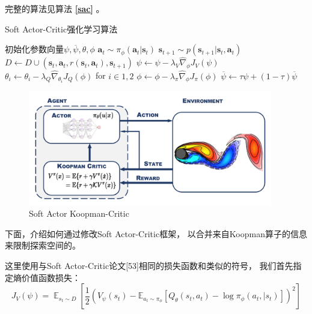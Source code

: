 \documentclass[AutoFakeBold]{LZUThesis}
\begin{document}
完整的算法见算法 \textbf{\ref{sac}} 。

\begin{algorithm}[H]
  \caption{Soft Actor-Critic强化学习算法}
  \label{sac}
  \begin{algorithmic}[1]
    \State 初始化参数向量$\psi, \overline{\psi},\theta,\phi$
	\State $\mathbf{a}_t \sim \pi_\phi(\mathbf{a}_t | \mathbf{s}_t)$
	\State $\mathbf{s}_{t + 1} \sim p(\mathbf{s}_{t + 1} | \mathbf{s}_t, \mathbf{a}_t)$
	\State $D \leftarrow D \cup { (\mathbf{s}_t, \mathbf{a}_t, r(\mathbf{s}_t, \mathbf{a}_t), \mathbf{s}_{t + 1}) }$
      \EndFor
	\State $\psi \leftarrow \psi - \lambda_V \hat{\nabla}_\phi J_V(\psi)$
	\State $\theta_i \leftarrow \theta_i - \lambda_Q \hat{\nabla}_{\theta_i}
	J_Q(\phi)$ for $i \in {1, 2}$
	\State $\phi \leftarrow \phi - \lambda_\pi \hat{\nabla}_\phi J_\pi(\phi)$
	\State $\overline{\psi} \leftarrow \tau \psi + (1 - \tau) \overline{\psi}$
      \EndFor
    \EndFor
  \end{algorithmic}
\end{algorithm}

\begin{figure}[htbp]
  \centering
    \includegraphics[width=0.95\textwidth]{figures/sakc.pdf}
  \caption{Soft Actor Koopman-Critic}
  \label{fig_sakc}
\end{figure}

下面，介绍如何通过修改Soft Actor-Critic框架\cite{haarnoja_soft_2018}，
以合并来自Koopman算子的信息来限制探索空间的。

这里使用与Soft Actor-Critic论文[53]相同的损失函数和类似的符号，
我们首先指定熵价值函数损失：
\begin{equation}
  J_{V}(\psi) = \mathop{\mathbb{E}}_{s_t \sim D}
  \left[ \frac12 ( V_{\psi}(s_t) - \mathbb{E}_{a_t \sim \pi_{\phi}}
  \left[ Q_\theta(s_t, a_t) - \log \pi_{\phi}(a_t, | s_t) \right] )^2 \right]
\end{equation}
\end{document}
